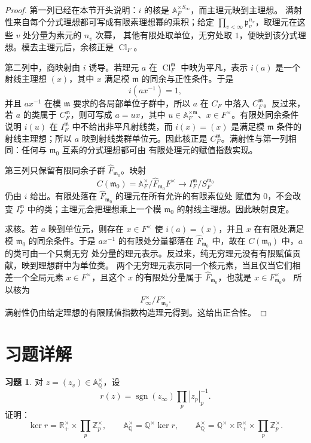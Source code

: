 \documentclass[11pt,a4paper,openany]{ctexbook}
\numberwithin{equation}{chapter}
\newcommand{\Q}{\mathbb{Q}}
\newcommand{\R}{\mathbb{R}}
\newcommand{\Z}{\mathbb{Z}}
\newcommand{\A}{\mathbb{A}}
\newcommand{\Cl}{\operatorname{Cl}}
\theoremstyle{plain}
\theoremstyle{definition}
\newtheorem{exercise}[theorem]{习题}
\theoremstyle{remark}
\begin{document}
\begin{proof}
第一列已经在本节开头说明：$i$ 的核是 $\A_F^{\times S_\infty}$，而主理元映到主理想。
满射性来自每个分式理想都可写成有限素理想幂的乘积；给定
$\prod_{v<\infty}\mathfrak p_v^{n_v}$，取理元在这些 $v$ 处分量为素元的 $n_v$ 次幂，
其他有限处取单位，无穷处取 $1$，便映到该分式理想。模去主理元后，余核正是
$\Cl_F$。

第二列中，商映射由 $i$ 诱导。若理元 $a$ 在 $\Cl_F^{\mathfrak m}$ 中映为平凡，表示 $i(a)$ 是一个射线主理想 $(x)$，其中 $x$ 满足模 $\mathfrak m$ 的同余与正性条件。于是
\[
 i(ax^{-1})=1,
\]
并且 $ax^{-1}$ 在模 $\mathfrak m$ 要求的各局部单位子群中，所以 $a$ 在 $C_F$ 中落入
$C_F^{\mathfrak m}$。反过来，若 $a$ 的类属于 $C_F^{\mathfrak m}$，则可写成
$a=ux$，其中 $u\in\A_F^{\times\mathfrak m}$、$x\in F^\times$。有限处同余条件说明
$i(u)$ 在 $I_F^{\mathfrak m}$ 中不给出非平凡射线类，而 $i(x)=(x)$ 是满足模
$\mathfrak m$ 条件的射线主理想；所以 $a$ 映到射线类群单位元。因此核正是
$C_F^{\mathfrak m}$。满射性与第一列相同：任何与 $\mathfrak m_0$ 互素的分式理想都可由
有限处理元的赋值指数实现。

第三列只保留有限同余子群 $\widehat F_{\mathfrak m_0}$。映射
\[
C(\mathfrak m_0)=\A_F^\times/\widehat F_{\mathfrak m_0}F^\times
\longrightarrow I_F^{\mathfrak m}/S_F^{\mathfrak m_0}
\]
仍由 $i$ 给出。有限处落在 $\widehat F_{\mathfrak m_0}$ 的理元在所有允许的有限素位处
赋值为 $0$，不会改变 $I_F^{\mathfrak m}$ 中的类；主理元会把理想乘上一个模
$\mathfrak m_0$ 的射线主理想。因此映射良定。

求核。若 $a$ 映到单位元，则存在 $x\in F^\times$ 使 $i(a)=(x)$，并且 $x$ 在有限处满足
模 $\mathfrak m_0$ 的同余条件。于是 $ax^{-1}$ 的有限处分量都落在
$\widehat F_{\mathfrak m_0}$ 中，故在 $C(\mathfrak m_0)$ 中，$a$ 的类可由一个只剩无穷
处分量的理元表示。反过来，纯无穷理元没有有限赋值贡献，映到理想群中为单位类。
两个无穷理元表示同一个核元素，当且仅当它们相差一个全局元素 $x\in F^\times$，且这个
$x$ 的有限处分量属于 $\widehat F_{\mathfrak m_0}$，也就是 $x\in F_{\mathfrak m_0}^\times$。
所以核为
\[
 F_\infty^\times/F_{\mathfrak m_0}^\times.
\]
满射性仍由给定理想的有限赋值指数构造理元得到。这给出正合性。
\end{proof}

\section*{习题详解}

\begin{exercise}
对 $z=(z_v)\in\A_\Q^\times$，设
\[
 r(z)=\operatorname{sgn}(z_\infty)\prod_p|z_p|_p^{-1}.
\]
证明：
\[
 \ker r=\R_+^\times\times\prod_p\Z_p^\times,\qquad
 \A_\Q^\times=\Q^\times\ker r,\qquad
 \A_\Q^\times=\Q^\times\times\R_+^\times\times\prod_p\Z_p^\times.
\]
\end{exercise}
\end{document}
